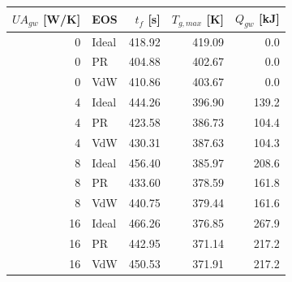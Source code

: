 \begin{tabular}{rlrrr}
\toprule
$UA_{gw}$ [W/K] & EOS & $t_f$ [s] & $T_{g,max}$ [K] & $Q_{gw}$ [kJ] \\
\midrule
0 & Ideal & 418.92 & 419.09 & 0.0 \\
0 & PR & 404.88 & 402.67 & 0.0 \\
0 & VdW & 410.86 & 403.67 & 0.0 \\
4 & Ideal & 444.26 & 396.90 & 139.2 \\
4 & PR & 423.58 & 386.73 & 104.4 \\
4 & VdW & 430.31 & 387.63 & 104.3 \\
8 & Ideal & 456.40 & 385.97 & 208.6 \\
8 & PR & 433.60 & 378.59 & 161.8 \\
8 & VdW & 440.75 & 379.44 & 161.6 \\
16 & Ideal & 466.26 & 376.85 & 267.9 \\
16 & PR & 442.95 & 371.14 & 217.2 \\
16 & VdW & 450.53 & 371.91 & 217.2 \\
\bottomrule
\end{tabular}

